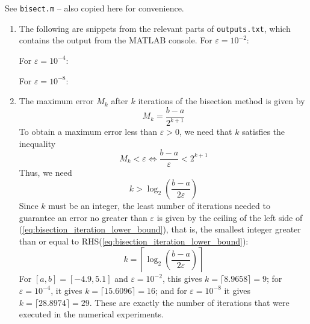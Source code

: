 \documentclass{homework}
\begin{document}
\maketitle

\question
\begin{alphaparts}
	\questionpart See \verb*|bisect.m| -- also copied here for convenience.
	
	\questionpart \begin{enumerate}[label=\textbf{(\arabic*)}]
		\item The following are snippets from the relevant parts of \verb*|outputs.txt|, which contains the output from the MATLAB console. For $\varepsilon = 10^{-2}$:
		
		For $\varepsilon = 10^{-4}$:
		
		
		For $\varepsilon = 10^{-8}$:
		
		\item The maximum error $M_k$ after $k$ iterations of the bisection method is given by \begin{equation}
			M_k = \frac{b-a}{2^{k+1}}
		\end{equation}
		To obtain a maximum error less than $\varepsilon > 0$, we need that $k$ satisfies the inequality
		\begin{equation}
			M_k < \varepsilon \iff \frac{b-a}{\varepsilon} < 2^{k+1}
		\end{equation}
		Thus, we need
		\begin{equation}
			\label{eq:bisection_iteration_lower_bound}
			k > \log_2\left(\frac{b-a}{2\varepsilon}\right)
		\end{equation}
		Since $k$ must be an integer, the least number of iterations needed to guarantee an error no greater than $\varepsilon$ is given by the ceiling of the left side of (\ref{eq:bisection_iteration_lower_bound}), that is, the smallest integer greater than or equal to RHS(\ref{eq:bisection_iteration_lower_bound}):
		\begin{equation}
			k = \left\lceil \log_2\left(\frac{b-a}{2\varepsilon}\right) \right\rceil
		\end{equation}
		For $[a,b] = [-4.9,5.1]$ and $\varepsilon = 10^{-2}$, this gives $k = \lceil 8.9658 \rceil = 9$; for $\varepsilon = 10^{-4}$, it gives $k = \lceil 15.6096\rceil = 16$; and for $\varepsilon = 10^{-8}$ it gives $k=\lceil 28.8974\rceil = 29$. These are exactly the number of iterations that were executed in the numerical experiments.
	\end{enumerate}
	
\end{alphaparts}
\end{document}
